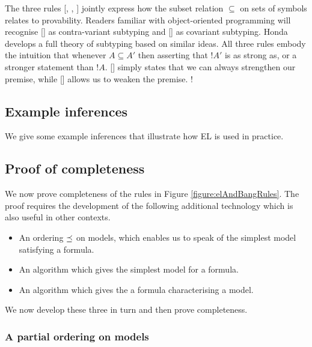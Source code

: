 The three rules [, ,
  ] jointly express how the subset relation
$\subseteq$ on sets of symbols relates to provability. Readers
familiar with object-oriented programming will recognise
[] as contra-variant subtyping and [] as covariant subtyping. Honda \cite{HondaK:thetypftpc}
develops a full theory of subtyping based on similar ideas.  All three
rules embody the intuition that whenever $A \subseteq A'$ then
asserting that $!A'$ is as strong as, or a stronger statement than
$!A$. [] simply states that we can always strengthen
our premise, while [] allows us to weaken the
premise. !

\subsection{Example inferences}

We give some example inferences that illustrate how EL is used in
practice.
  
\subsection{Proof of completeness}\label{completenessProof}

\NI We now prove completeness of the rules in Figure
\ref{figure:elAndBangRules}.  The proof requires the development of
the following additional technology which is also useful in other
contexts.

\begin{itemize}

\item An ordering $\preceq$ on models, which enables us to speak of
  the simplest model satisfying a formula.

\item An algorithm which gives the simplest model for a formula.

\item An algorithm which gives the a formula characterising a model.

\end{itemize}

\NI We now develop these three in turn and then prove completeness.

\subsubsection{A partial ordering on models}

